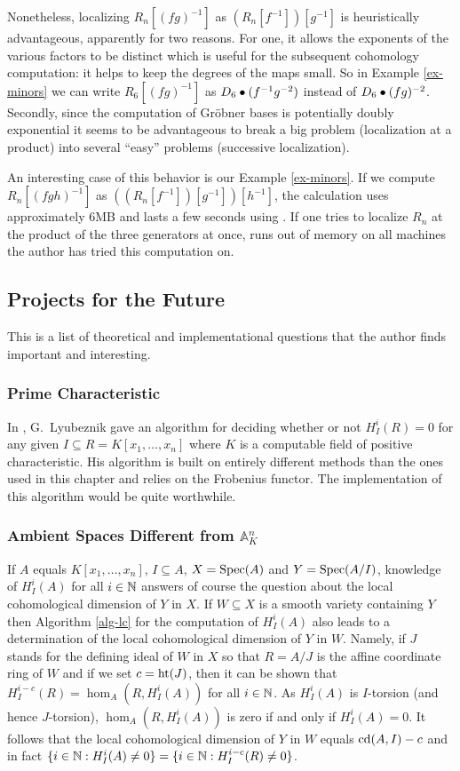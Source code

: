 Nonetheless, localizing $R_n[(fg)^{-1}]$ as $(R_n[f^{-1}])[g^{-1}]$ is
heuristically advantageous, apparently for two reasons. For 
one, it allows the exponents of the various factors to be distinct
which is useful for the subsequent cohomology computation: it helps
to keep the degrees of the maps small. So in
Example \ref{ex-minors} we can write $R_6[(fg)^{-1}]$ as $D_6\bullet 
(f^{-1} g^{-2})$ instead
of $D_6\bullet (fg)^{-2}$. 
Secondly,  
since the computation of Gr\"obner bases is potentially 
doubly exponential it
seems to be advantageous to break a big problem (localization at a
product) into several ``easy'' problems (successive localization).

An interesting case of this behavior is our Example \ref{ex-minors}. If we
compute $R_n[(fgh)^{-1}]$ as $((R_n[f^{-1}])[g^{-1}])[h^{-1}]$, 
the calculation uses
approximately 6MB and lasts a few seconds 
using \Mtwo. If one tries to localize $R_n$ at the
product of the three generators at once, \Mtwo 
runs out of memory on all machines the author has 
tried this computation on.
\subsection{Projects for the Future}
This is a list of theoretical and implementational questions that the
author finds 
important and interesting.
\subsubsection{Prime Characteristic} In \cite{DM:L-Fmod},
G.~Lyubeznik gave an
algorithm for deciding whether or not 
$H^i_I(R)=0$ for any given  $I\subseteq R=K[x_1,\ldots,x_n]$ where
$K$ is a computable field of positive characteristic. His algorithm is built on
entirely different methods than the ones used in this chapter 
and relies on the Frobenius functor. The
implementation of this algorithm would be quite worthwhile.
\subsubsection{Ambient Spaces Different from ${\mathbb A}^n_K$}
If $A$ equals $K[x_1,\ldots,x_n]$, 
$I\subseteq A$, $X=\operatorname{Spec} (A)$ and $Y=\operatorname{Spec}(A/I)$,
knowledge of $H^i_I(A)$ for all $i\in {\mathbb N}$ answers of course the
question about the local cohomological dimension of $Y$ in $X$. 
If $W\subseteq X$ is a smooth variety containing $Y$
then Algorithm \ref{alg-lc} for the computation of $H^i_I(A)$ also
leads to a determination of the local cohomological dimension of $Y$
in $W$. Namely, if $J$ stands for the
defining ideal of $W$ in $X$ so that $R=A/J$ is the affine
coordinate ring of $W$  and if we set $c=\operatorname{ht}(J)$, then it can be
shown that 
$H^{i-c}_{I}(R)=\hom_A(R,H^i_I(A))$ for all $i\in{\mathbb N}$.
As $H^i_I(A)$ is 
$I$-torsion (and hence $J$-torsion), $\hom_A(R,H^i_I(A))$ is zero if
and only if 
$H^i_I(A)=0$. It follows that the local cohomological dimension of $Y$
in $W$ equals $\operatorname{cd}(A,I)-c$ and in fact $\{i\in {\mathbb N}:H^i_I(A)\not =0\}=\{i\in
{\mathbb N}:H^{i-c}_I(R)\not =0\}$. 

